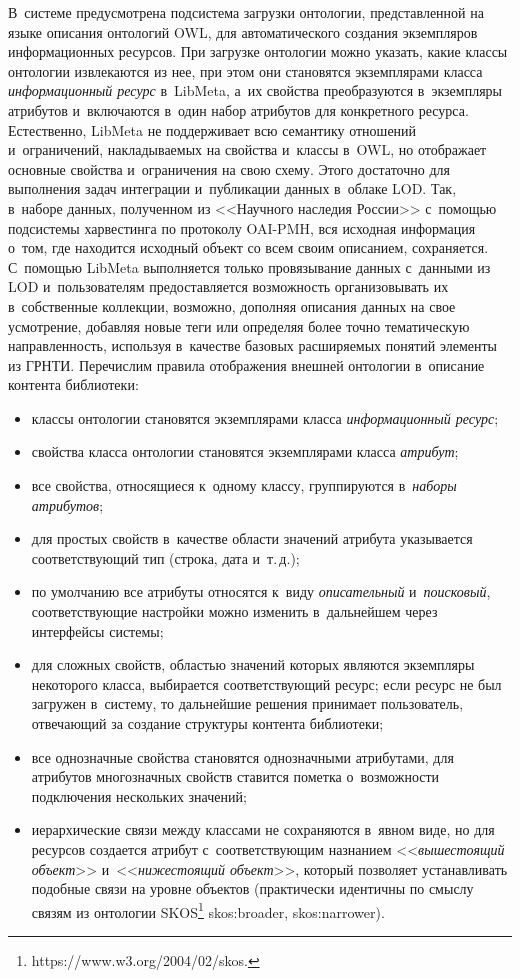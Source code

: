 \begin{multicols}{2}
    В~системе предусмотрена подсистема загрузки онтологии, 
представленной на языке описания онтологий OWL, для автоматического 
создания экземпляров информационных ресурсов. При загрузке онтологии 
можно указать, какие классы онтологии извлекаются из нее, при этом они 
становятся экземплярами класса \textit{информационный ресурс} в~\mbox{LibMeta}, 
а~их свойства преобразуются в~экземпляры атрибутов и~включаются в~один 
набор атрибутов для конкретного ресурса. Естественно, \mbox{LibMeta} не 
поддерживает всю семантику отношений и~ограничений, накладываемых на 
свойства и~классы в~OWL, но отображает основные свойства и~ограничения 
на свою схему. Этого достаточно для выполнения задач интеграции 
и~публикации данных в~облаке LOD. Так, в~наборе данных, полученном из 
<<Научного наследия России>> с~по\-мощью подсистемы харвестинга по 
протоколу OAI-PMH, вся исходная информация о~том, где находится 
исходный объект со всем своим описанием, сохраняется. С~по\-мощью 
\mbox{LibMeta} выполняется только провязывание данных с~данными из LOD 
и~пользователям предоставляется возможность организовывать их 
в~собственные коллекции, возможно, дополняя описания данных на свое 
усмотрение, добавляя новые теги или определяя более точно тематическую 
направленность, используя в~качестве базовых расширяемых понятий 
элементы из ГРНТИ. Перечислим правила отоб\-ра\-же\-ния внешней онтологии 
в~описание контента библиотеки:
    \begin{itemize}
\item классы онтологии становятся экземплярами класса 
\textit{информационный ресурс};
\item свойства класса онтологии становятся экземплярами класса 
\textit{атрибут};
\item все свойства, относящиеся к~одному классу, группируются 
в~\textit{наборы атрибутов};
\item для простых свойств в~качестве области значений атрибута указывается 
соответствующий тип (строка, дата и~т.\,д.);
\item по умолчанию все атрибуты относятся к~виду \textit{описательный} 
и~\textit{поисковый}, соответствующие настройки можно изменить 
в~дальнейшем через интерфейсы системы;
\item для сложных свойств, областью значений которых являются 
экземпляры некоторого класса, выбирается соответствующий ресурс; если 
ресурс не был загружен в~систему, то дальнейшие решения принимает 
пользователь, отвечающий за создание структуры контента библиотеки;
\item все однозначные свойства становятся однозначными атрибутами, для 
атрибутов многозначных свойств ставится пометка о~воз\-мож\-ности 
подключения нескольких значений;
\item иерархические связи между классами не сохраняются в~явном виде, но 
для ресурсов создается атрибут с~соответствующим назнанием 
<<\textit{вышестоящий объект}>> и~<<\textit{нижестоящий объект}>>, 
кото\-рый позволяет устанавливать подобные связи на уровне объектов 
(практически идентичны по смыслу связям из онтологии SKOS\footnote{{\sf  
https://www.w3.org/2004/02/skos.}} skos:broader, skos:narrower).
\end{itemize}


\end{multicols}
